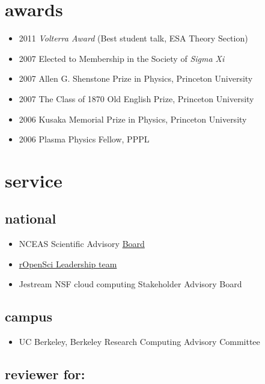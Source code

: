 \documentclass[11pt,a4paper,sans]{moderncv}        %
\providecommand{\tightlist}{%
    \setlength{\itemsep}{0pt}\setlength{\parskip}{0pt}}
\begin{document}
\section{awards}\label{awards}

\begin{itemize}
\tightlist
\item
  2011 \emph{Volterra Award} (Best student talk, ESA Theory Section)
\item
  2007 Elected to Membership in the Society of \emph{Sigma Xi}
\item
  2007 Allen G. Shenstone Prize in Physics, Princeton University
\item
  2007 The Class of 1870 Old English Prize, Princeton University
\item
  2006 Kusaka Memorial Prize in Physics, Princeton University
\item
  2006 Plasma Physics Fellow, PPPL
\end{itemize}

\section{service}\label{service}

\subsection{national}\label{national}

\begin{itemize}
\tightlist
\item
  NCEAS Scientific Advisory
  \href{https://www.nceas.ucsb.edu/news/nceas-appoints-new-science-advisers}{Board}
\item
  \href{http://ropensci.org/about/\#leadership}{rOpenSci Leadership
  team}
\item
  Jestream NSF cloud computing Stakeholder Advisory Board
\end{itemize}

\subsection{campus}\label{campus}

\begin{itemize}
\tightlist
\item
  UC Berkeley, Berkeley Research Computing Advisory Committee
\end{itemize}

\subsection{reviewer for:}\label{reviewer-for}
\end{document}

